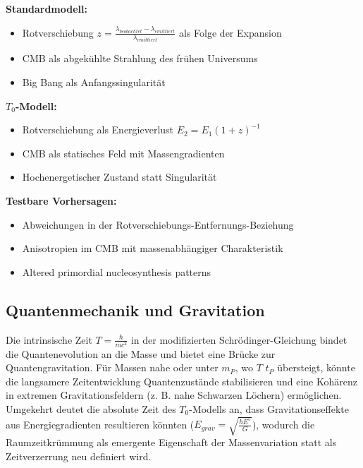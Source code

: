 \documentclass[a4paper,12pt]{article}
\begin{document}
	\begin{tcolorbox}[colback=green!5!white,colframe=green!75!black,title=Neuinterpretation kosmologischer Phänomene]
		\textbf{Standardmodell:}
		\begin{itemize}
			\item Rotverschiebung $z = \frac{\lambda_{beobachtet} - \lambda_{emittiert}}{\lambda_{emittiert}}$ als Folge der Expansion
			\item CMB als abgekühlte Strahlung des frühen Universums
			\item Big Bang als Anfangssingularität
		\end{itemize}
		
		\textbf{$T_0$-Modell:}
		\begin{itemize}
			\item Rotverschiebung als Energieverlust $E_2 = E_1(1+z)^{-1}$
			\item CMB als statisches Feld mit Massengradienten
			\item Hochenergetischer Zustand statt Singularität
		\end{itemize}
		
		\textbf{Testbare Vorhersagen:}
		\begin{itemize}
			\item Abweichungen in der Rotverschiebungs-Entfernungs-Beziehung
			\item Anisotropien im CMB mit massenabhängiger Charakteristik
			\item Altered primordial nucleosynthesis patterns
		\end{itemize}
	\end{tcolorbox}
	
	\subsection{Quantenmechanik und Gravitation}
	Die intrinsische Zeit \( T = \frac{\hbar}{m c^2} \) in der modifizierten Schrödinger-Gleichung bindet die Quantenevolution an die Masse und bietet eine Brücke zur Quantengravitation. Für Massen nahe oder unter \( m_P \), wo \( T \) \( t_P \) übersteigt, könnte die langsamere Zeitentwicklung Quantenzustände stabilisieren und eine Kohärenz in extremen Gravitationsfeldern (z. B. nahe Schwarzen Löchern) ermöglichen. Umgekehrt deutet die absolute Zeit des \( T_0 \)-Modells an, dass Gravitationseffekte aus Energiegradienten resultieren könnten (\( E_{grav} = \sqrt{\frac{\hbar E^5}{G}} \)), wodurch die Raumzeitkrümmung als emergente Eigenschaft der Massenvariation statt als Zeitverzerrung neu definiert wird.
	
\end{document}
